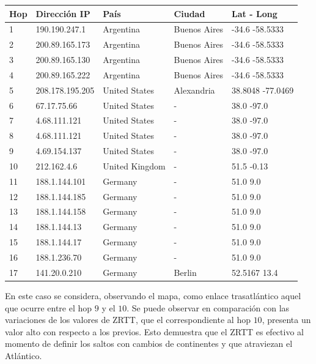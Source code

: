 \begin{center}
 \begin{tabular}{|l|l|l|l|l|}
    \hline
    Hop &Dirección IP &País &Ciudad &Lat - Long \\ \hline \hline
    1 & 190.190.247.1 & Argentina & Buenos Aires & -34.6 -58.5333	\\ \hline
    2 & 200.89.165.173 & Argentina & Buenos Aires & -34.6 -58.5333	\\ \hline
    3 & 200.89.165.130 & Argentina & Buenos Aires & -34.6 -58.5333	\\ \hline
    4 & 200.89.165.222 & Argentina & Buenos Aires & -34.6 -58.5333	\\ \hline
    5 & 208.178.195.205 & United States & Alexandria & 38.8048 -77.0469 \\ \hline
    6 & 67.17.75.66 & United States & - & 38.0 -97.0 \\ \hline
    7 & 4.68.111.121 & United States & - & 38.0 -97.0 \\ \hline
    8 & 4.68.111.121 & United States & - & 38.0 -97.0 \\ \hline
    9 & 4.69.154.137 & United States & - & 38.0 -97.0 \\ \hline
    10 & 212.162.4.6 & United Kingdom & - &  51.5 -0.13 \\ \hline
    11 & 188.1.144.101 & Germany & - & 51.0 9.0 \\ \hline
    12 & 188.1.144.185 & Germany & - & 51.0 9.0 \\ \hline
    13 & 188.1.144.158 & Germany & - & 51.0 9.0 \\ \hline
    14 & 188.1.144.13 & Germany & - & 51.0 9.0 \\ \hline
    15 & 188.1.144.17 & Germany & - & 51.0 9.0 \\ \hline
    16 & 188.1.236.70 & Germany & - & 51.0 9.0 \\ \hline
    17 & 141.20.0.210 & Germany & Berlin & 52.5167 13.4 \\ \hline
 \end{tabular}
\end{center}

En este caso se considera, observando el mapa, como enlace trasatlántico aquel que ocurre entre el hop $9$ y el $10$. Se puede observar en comparación con las variaciones de los valores de ZRTT, que el correspondiente al hop $10$, presenta un valor alto con respecto a los previos. Esto demuestra que el ZRTT es efectivo al momento de definir los saltos con cambios de continentes y que atraviezan el Atlántico. 


